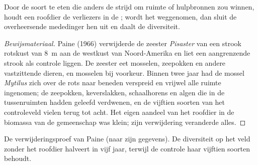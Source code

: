 \begin{proposition}\label{prop:b1:species-interactions:paine}
Door de soort te eten die anders de strijd om ruimte of hulpbronnen zou
winnen, houdt een roofdier de verliezers in de ; wordt het
weggenomen, dan sluit de overheersende mededinger hen uit en daalt de
diversiteit.
\end{proposition}
\begin{proof}[Bewijsmateriaal]
Paine (1966) verwijderde de zeester \emph{Pisaster} van een strook rotskust
van \qty{8}{m} aan de westkust van Noord-Amerika en liet een aangrenzende
strook als controle liggen. De zeester eet mosselen, zeepokken en andere
vastzittende dieren, en mosselen bij voorkeur. Binnen twee jaar had de mossel
\emph{Mytilus} zich over de rots naar beneden verspreid en vrijwel alle
ruimte ingenomen; de zeepokken, keverslakken, schaalhorens en algen die in de
tussenruimten hadden geleefd verdwenen, en de vijftien soorten van het
controleveld vielen terug tot acht. Het eigen aandeel van het roofdier in de
biomassa van de gemeenschap was klein; zijn verwijdering veranderde alles.
\end{proof}

\begin{omfigure}

{\small De verwijderingsproef van Paine (naar zijn gegevens). De diversiteit
op het veld zonder het roofdier halveert in vijf jaar, terwijl de controle
haar vijftien soorten behoudt.}
\end{omfigure}

